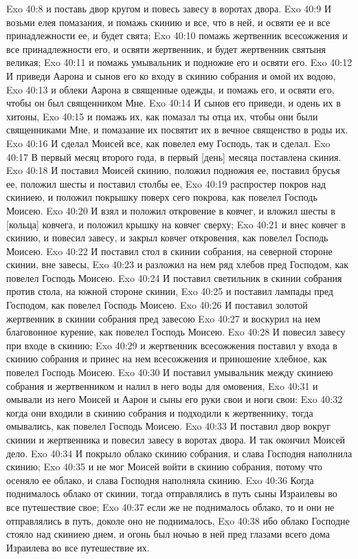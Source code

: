 Exo 40:8  и поставь двор кругом и повесь завесу в воротах двора.
Exo 40:9  И возьми елея помазания, и помажь скинию и все, что в ней, и освяти ее и все принадлежности ее, и будет свята;
Exo 40:10  помажь жертвенник всесожжения и все принадлежности его, и освяти жертвенник, и будет жертвенник святыня великая;
Exo 40:11  и помажь умывальник и подножие его и освяти его.
Exo 40:12  И приведи Аарона и сынов его ко входу в скинию собрания и омой их водою,
Exo 40:13  и облеки Аарона в священные одежды, и помажь его, и освяти его, чтобы он был священником Мне.
Exo 40:14  И сынов его приведи, и одень их в хитоны,
Exo 40:15  и помажь их, как помазал ты отца их, чтобы они были священниками Мне, и помазание их посвятит их в вечное священство в роды их.
Exo 40:16  И сделал Моисей все, как повелел ему Господь, так и сделал.
Exo 40:17  В первый месяц второго года, в первый [день] месяца поставлена скиния.
Exo 40:18  И поставил Моисей скинию, положил подножия ее, поставил брусья ее, положил шесты и поставил столбы ее,
Exo 40:19  распростер покров над скиниею, и положил покрышку поверх сего покрова, как повелел Господь Моисею.
Exo 40:20  И взял и положил откровение в ковчег, и вложил шесты в [кольца] ковчега, и положил крышку на ковчег сверху;
Exo 40:21  и внес ковчег в скинию, и повесил завесу, и закрыл ковчег откровения, как повелел Господь Моисею.
Exo 40:22  И поставил стол в скинии собрания, на северной стороне скинии, вне завесы,
Exo 40:23  и разложил на нем ряд хлебов пред Господом, как повелел Господь Моисею.
Exo 40:24  И поставил светильник в скинии собрания против стола, на южной стороне скинии,
Exo 40:25  и поставил лампады пред Господом, как повелел Господь Моисею.
Exo 40:26  И поставил золотой жертвенник в скинии собрания пред завесою
Exo 40:27  и воскурил на нем благовонное курение, как повелел Господь Моисею.
Exo 40:28  И повесил завесу при входе в скинию;
Exo 40:29  и жертвенник всесожжения поставил у входа в скинию собрания и принес на нем всесожжения и приношение хлебное, как повелел Господь Моисею.
Exo 40:30  И поставил умывальник между скиниею собрания и жертвенником и налил в него воды для омовения,
Exo 40:31  и омывали из него Моисей и Аарон и сыны его руки свои и ноги свои:
Exo 40:32  когда они входили в скинию собрания и подходили к жертвеннику, тогда омывались, как повелел Господь Моисею.
Exo 40:33  И поставил двор вокруг скинии и жертвенника и повесил завесу в воротах двора. И так окончил Моисей дело.
Exo 40:34  И покрыло облако скинию собрания, и слава Господня наполнила скинию;
Exo 40:35  и не мог Моисей войти в скинию собрания, потому что осеняло ее облако, и слава Господня наполняла скинию.
Exo 40:36  Когда поднималось облако от скинии, тогда отправлялись в путь сыны Израилевы во все путешествие свое;
Exo 40:37  если же не поднималось облако, то и они не отправлялись в путь, доколе оно не поднималось,
Exo 40:38  ибо облако Господне стояло над скиниею днем, и огонь был ночью в ней пред глазами всего дома Израилева во все путешествие их.


